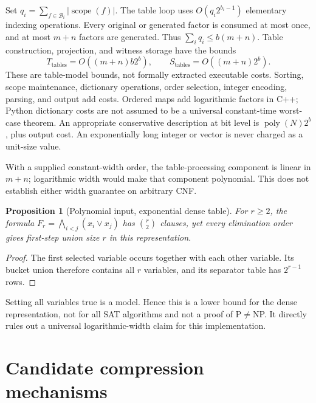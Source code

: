 \documentclass[11pt]{article}
\newtheorem{proposition}[theorem]{Proposition}
\newcommand{\scope}{\operatorname{scope}}
\begin{document}
Set $q_i=\sum_{f\in\mathcal B_i}|\scope(f)|$.
The table loop uses $O(q_i2^{b_i-1})$ elementary indexing operations.
Every original or generated factor is consumed at most once, and at most
$m+n$ factors are generated. Thus $\sum_iq_i\leq b(m+n)$.
Table construction, projection, and witness storage have the bounds
\begin{equation}\label{eq:cost}
T_{\mathrm{tables}}=O((m+n)b2^b),\qquad
S_{\mathrm{tables}}=O((m+n)2^b).
\end{equation}
These are table-model bounds, not formally extracted executable costs.
Sorting, scope maintenance, dictionary operations, order selection,
integer encoding, parsing, and output add costs.
Ordered maps add logarithmic factors in C++; Python dictionary costs are
not assumed to be a universal constant-time worst-case theorem.
An appropriate conservative description at bit level is
$\operatorname{poly}(N)2^b$, plus output cost.
An exponentially long integer or vector is never charged as a unit-size value.

With a supplied constant-width order, the table-processing component is
linear in $m+n$; logarithmic width would make that component polynomial.
This does not establish either width guarantee on arbitrary CNF.

\begin{proposition}[Polynomial input, exponential dense table]\label{prop:clique}
For $r\geq2$, the formula
$F_r=\bigwedge_{i<j}(x_i\lor x_j)$ has $\binom r2$ clauses, yet every
elimination order gives first-step union size $r$ in this representation.
\end{proposition}
\begin{proof}
The first selected variable occurs together with each other variable.
Its bucket union therefore contains all $r$ variables, and its separator
table has $2^{r-1}$ rows.
\end{proof}
Setting all variables true is a model. Hence this is a lower bound for
the dense representation, not for all SAT algorithms and not a proof
of P$\ne$NP. It directly rules out a universal logarithmic-width claim
for this implementation.

\section{Candidate compression mechanisms}
\end{document}
